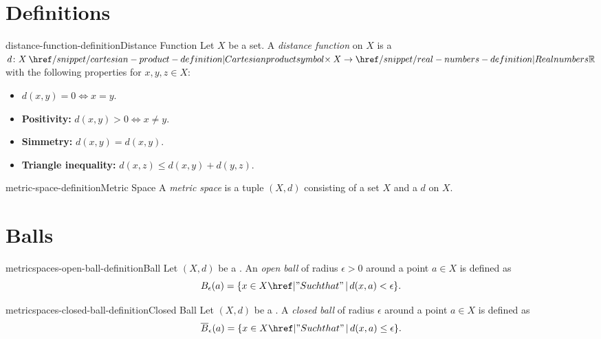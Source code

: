 \documentclass[preview]{standalone}
\begin{document}
\genpage

\section{Definitions}

\begin{snippetdefinition}{distance-function-definition}{Distance Function}
    Let \(X\) be a set.
    A \textit{distance function} on \(X\) is
    a \function \(d \colon X \cartesianprod X \to \realnumbers\)
    with the following properties for \(x,y,z \in X\):
    \begin{itemize}
        \item \(d(x,y) = 0 \iff x = y\).
        \item \textbf{Positivity:} \(d(x,y) > 0 \iff x \neq y\).
        \item \textbf{Simmetry:} \(d(x,y) = d(x,y)\).
        \item \textbf{Triangle inequality:} \(d(x,z) \leq d(x,y) + d(y,z)\).
    \end{itemize}
\end{snippetdefinition}

\begin{snippetdefinition}{metric-space-definition}{Metric Space}
    A \textit{metric space} is a tuple \((X, d)\)
    consisting of a set \(X\) and a \distancefunction \(d\) on \(X\).
\end{snippetdefinition}



\section{Balls}

\begin{snippetdefinition}{metricspaces-open-ball-definition}{Ball}
    Let \((X, d)\) be a \metricspace.
    An \textit{open ball} of radius \(\epsilon > 0\) around a point
    \(a \in X\) is defined as
    \[
        B_\epsilon(a) = \{x \in X \suchthat d(x,a) < \epsilon\}.
    \]
\end{snippetdefinition}

\begin{snippetdefinition}{metricspaces-closed-ball-definition}{Closed Ball}
    Let \((X, d)\) be a \metricspace.
    A \textit{closed ball} of radius \(\epsilon\) around a point
    \(a \in X\) is defined as
    \[
        \overline{B}_\epsilon(a) = \{x \in X \suchthat d(x,a) \leq \epsilon\}.
    \]
\end{snippetdefinition}
\end{document}
